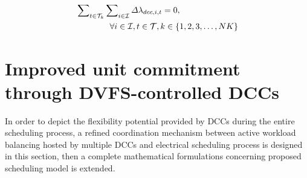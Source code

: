 \documentclass[lettersize,journal]{IEEEtran}
\begin{document}
\vspace{-0.25cm}
\begin{subequations}
\begin{align}
  & \sum\nolimits_{t\in\mathcal{T}_{k}}\sum\nolimits_{i\in\mathcal{I}} \varDelta \lambda_{dcc,i,t} = 0, \notag\\ 
  & \qquad \qquad \forall i\in \mathcal{I}, t\in\mathcal{T}, k\in\{1,2,3,\ldots, NK\}
\end{align}
\end{subequations}


\section{Improved unit commitment through DVFS-controlled DCCs}


In order to depict the flexibility potential provided by DCCs during the entire scheduling process, a refined coordination mechanism between active workload balancing hosted by multiple DCCs and electrical scheduling process is designed in this section, then a complete mathematical formulations concerning proposed scheduling model is extended.
\end{document}
